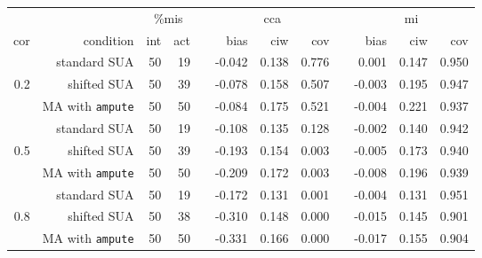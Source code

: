 \documentclass[]{interact}
\newcommand{\code}[1]{\texttt{#1}}
\begin{document}
\begin{table}
{\begin{tabular}{rrrrrrrrrrrr}
  \hline
&& \multicolumn{2}{c}{\%mis} && \multicolumn{3}{c}{cca} && \multicolumn{3}{c}{mi} \\
\cline{3-4} \cline{6-8} \cline{10-12}
cor & condition & int & act & & bias & ciw & cov & & bias & ciw & cov \\ 
\hline
 & standard SUA & 50 & 19 &  & -0.042 & 0.138 & 0.776 &  & 0.001 & 0.147 & 0.950 \\ 
  0.2 & shifted SUA & 50 & 39 &  & -0.078 & 0.158 & 0.507 &  & -0.003 & 0.195 & 0.947 \\ 
   & MA with \code{ampute} & 50 & 50 &  & -0.084 & 0.175 & 0.521 &  & -0.004 & 0.221 & 0.937 \\ 
   \cline{2-12}
   & standard SUA & 50 & 19 &  & -0.108 & 0.135 & 0.128 &  & -0.002 & 0.140 & 0.942 \\ 
  0.5 & shifted SUA & 50 & 39 &  & -0.193 & 0.154 & 0.003 &  & -0.005 & 0.173 & 0.940 \\ 
   & MA with \code{ampute} & 50 & 50 &  & -0.209 & 0.172 & 0.003 &  & -0.008 & 0.196 & 0.939 \\ 
   \cline{2-12}
   & standard SUA & 50 & 19 &  & -0.172 & 0.131 & 0.001 &  & -0.004 & 0.131 & 0.951 \\ 
  0.8 & shifted SUA & 50 & 38 &  & -0.310 & 0.148 & 0.000 &  & -0.015 & 0.145 & 0.901 \\ 
   & MA with \code{ampute} & 50 & 50 &  & -0.331 & 0.166 & 0.000 &  & -0.017 & 0.155 & 0.904 \\ 
   \hline
\end{tabular}}
  \label{sim2c}
  \end{table}
  
\end{document}
